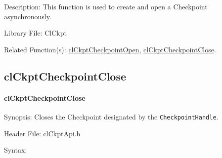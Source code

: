 \begin{flushleft}
\begin{Desc}
\begin{description}
\end{description}
\end{Desc}
\begin{Desc}
\item[Description:]This function is used to create and open a Checkpoint asynchronously.\end{Desc}
\begin{Desc}
\item[Library File:]Cl\-Ckpt\end{Desc}
\begin{Desc}
\item[Related Function(s):]\hyperlink{pageckpt103}{cl\-Ckpt\-Checkpoint\-Open}, \hyperlink{pageckpt105}{cl\-Ckpt\-Checkpoint\-Close}. \end{Desc}
\newpage


\subsection{clCkptCheckpointClose}
\hypertarget{pageckpt105}{}\paragraph{cl\-Ckpt\-Checkpoint\-Close}\label{pageckpt105}
\begin{Desc}
\item[Synopsis:]Closes the Checkpoint designated by the {\tt{Checkpoint\-Handle}}.\end{Desc}
\begin{Desc}
\item[Header File:]clCkptApi.h\end{Desc}
\begin{Desc}
\item[Syntax:]


\end{Desc}
\end{flushleft}
